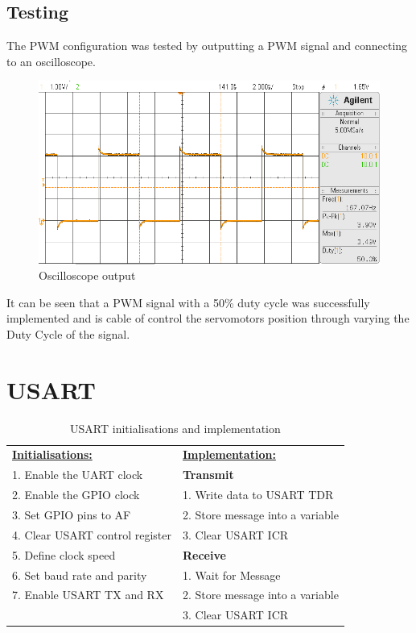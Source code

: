 \subsection{Testing}
\vspace{-5mm}
The PWM configuration was tested by outputting a PWM signal and connecting to an oscilloscope.

\begin{figure}[H]
    \centering
    \includegraphics[width=1\textwidth]{pwm.png}
    \vspace{-5mm}
    \caption{Oscilloscope output}
\end{figure}
\vspace{-5mm}
It can be seen that a PWM signal with a 50\% duty cycle was successfully implemented and is cable of control the servomotors position through varying the Duty Cycle of the signal.

\newpage
\section{USART}

\begin{table}[H]
\centering
    \begin{tabular}{|l|l|}
    \hline
            \textbf{\underline{Initialisations:}}&\textbf{\underline{Implementation:}}\\
            1. Enable the UART clock        & \textbf{Transmit}\\
            2. Enable the GPIO clock        & 1. Write data to USART TDR\\
            3. Set GPIO pins to AF          & 2. Store message into a variable\\
            4. Clear USART control register & 3. Clear USART ICR\\
            5. Define clock speed           & \textbf{Receive}\\
            6. Set baud rate and parity     & 1. Wait for Message\\
            7. Enable USART TX and RX       & 2. Store message into a variable\\
                                            & 3. Clear USART ICR\\
                                  \hline
    \end{tabular}\
    \vspace{-2mm}
    \caption{USART initialisations and implementation}
\end{table}


